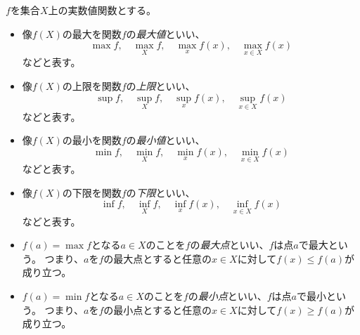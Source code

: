\begin{definition}[関数の最大・最小・上限・下限]
$f$を集合$X$上の実数値関数とする。
\begin{itemize}
\item
像$f(X)$の最大を関数$f$の\emph{最大値}といい、
$$
\max f, \quad \max_X f, \quad \max_x f(x), \quad \max_{x \in X}f(x)
$$
などと表す。
\item
像$f(X)$の上限を関数$f$の\emph{上限}といい、
$$
\sup f, \quad \sup_X f, \quad \sup_x f(x), \quad \sup_{x \in X}f(x)
$$
などと表す。
\item
像$f(X)$の最小を関数$f$の\emph{最小値}といい、
$$
\min f, \quad \min_X f, \quad \min_x f(x), \quad \min_{x \in X}f(x)
$$
などと表す。
\item
像$f(X)$の下限を関数$f$の\emph{下限}といい、
$$
\inf f, \quad \inf_X f, \quad \inf_x f(x), \quad \inf_{x \in X}f(x)
$$
などと表す。
\item
$f(a) = \max f$となる$a \in X$のことを$f$の\emph{最大点}といい、$f$は点$a$で最大という。
つまり、$a$を$f$の最大点とすると任意の$x \in X$に対して$f(x) \le f(a)$が成り立つ。
\item
$f(a) = \min f$となる$a \in X$のことを$f$の\emph{最小点}といい、$f$は点$a$で最小という。
つまり、$a$を$f$の最小点とすると任意の$x \in X$に対して$f(x) \ge f(a)$が成り立つ。
\end{itemize}
\end{definition}
